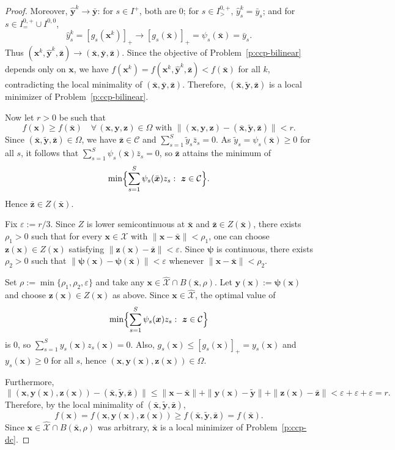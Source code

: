 \documentclass[10pt,a4paper]{amsart}
\def\C{\mathcal{C}}
\def\X{\mathcal{X}}
\def\bs{\boldsymbol}
\begin{document}
\begin{proof}
Moreover, $\hat{\bs{y}}^k\to\bar{\bs{y}}$: for $s\in I^+$, both are $0$; for $s\in I^{0,+}_{>}$,
$\hat y_s^k=\bar y_s$; and for $s\in I^{0,+}_{=}\cup I^{0,0}$,
\[
\hat y_s^k=[g_s(\bs{x}^k)]_+\to[g_s(\bar{\bs{x}})]_+=\psi_s(\bar{\bs{x}})=\bar y_s.
\]
Thus $(\bs{x}^k,\hat{\bs{y}}^k,\bar{\bs{z}})\to(\bar{\bs{x}},\bar{\bs{y}},\bar{\bs{z}})$.
Since the objective of Problem~\eqref{p:ccp-bilinear} depends only on $\bs{x}$, we have
$f(\bs{x}^k)=f(\bs{x}^k,\hat{\bs{y}}^k,\bar{\bs{z}})<f(\bar{\bs{x}})$ for all $k$, contradicting the local
minimality of $(\bar{\bs{x}},\bar{\bs{y}},\bar{\bs{z}})$. Therefore,
$(\bar{\bs{x}},\tilde{\bs{y}},\bar{\bs{z}})$ is a local minimizer of Problem~\eqref{p:ccp-bilinear}.

Now let $r>0$ be such that
\[
f(\bs{x})\ge f(\bar{\bs{x}})
\quad \forall\,(\bs{x},\bs{y},\bs{z})\in\Omega
\text{ with }
\|(\bs{x},\bs{y},\bs{z})-(\bar{\bs{x}},\tilde{\bs{y}},\bar{\bs{z}})\|<r.
\]
Since $(\bar{\bs{x}},\tilde{\bs{y}},\bar{\bs{z}})\in\Omega$, we have
$\bar{\bs{z}}\in\C$ and $\sum_{s=1}^S\tilde{y}_s\bar{z}_s=0$. As
$\tilde{y}_s=\psi_s(\bar{\bs{x}})\ge 0$ for all $s$, it follows that
$\sum_{s=1}^S\psi_s(\bar{\bs{x}})\bar{z}_s=0$, so $\bar{\bs{z}}$ attains the minimum of
\[
\min\Bigl\{\sum_{s=1}^S\psi_s(\bar{\bs{x}})z_s:\ \bs{z}\in\C\Bigr\}.
\]
Hence $\bar{\bs{z}}\in Z(\bar{\bs{x}})$.

Fix $\varepsilon:=r/3$. Since $Z$ is lower semicontinuous at $\bar{\bs{x}}$ and
$\bar{\bs{z}}\in Z(\bar{\bs{x}})$, there exists $\rho_1>0$ such that for every
$\bs{x}\in\X$ with $\|\bs{x}-\bar{\bs{x}}\|<\rho_1$, one can choose
$\bs{z}(\bs{x})\in Z(\bs{x})$ satisfying $\|\bs{z}(\bs{x})-\bar{\bs{z}}\|<\varepsilon$.
Since $\bs{\psi}$ is continuous, there exists $\rho_2>0$ such that
$\|\bs{\psi}(\bs{x})-\bs{\psi}(\bar{\bs{x}})\|<\varepsilon$ whenever
$\|\bs{x}-\bar{\bs{x}}\|<\rho_2$.

Set $\rho:=\min\{\rho_1,\rho_2,\varepsilon\}$ and take any
$\bs{x}\in\hat{\X}\cap B(\bar{\bs{x}},\rho)$. Let $\bs{y}(\bs{x}):=\bs{\psi}(\bs{x})$ and choose
$\bs{z}(\bs{x})\in Z(\bs{x})$ as above. Since $\bs{x}\in\hat{\X}$, the optimal value of
\[
\min\Bigl\{\sum_{s=1}^S\psi_s(\bs{x})z_s:\ \bs{z}\in\C\Bigr\}
\]
is $0$, so $\sum_{s=1}^S y_s(\bs{x})z_s(\bs{x})=0$. Also,
$g_s(\bs{x})\le[g_s(\bs{x})]_+=y_s(\bs{x})$ and $y_s(\bs{x})\ge 0$ for all $s$, hence
$(\bs{x},\bs{y}(\bs{x}),\bs{z}(\bs{x}))\in\Omega$.

Furthermore,
\[
\|(\bs{x},\bs{y}(\bs{x}),\bs{z}(\bs{x}))-(\bar{\bs{x}},\tilde{\bs{y}},\bar{\bs{z}})\|
\le \|\bs{x}-\bar{\bs{x}}\|+\|\bs{y}(\bs{x})-\tilde{\bs{y}}\|+\|\bs{z}(\bs{x})-\bar{\bs{z}}\|
<\varepsilon+\varepsilon+\varepsilon=r.
\]
Therefore, by the local minimality of $(\bar{\bs{x}},\tilde{\bs{y}},\bar{\bs{z}})$,
\[
f(\bs{x})=f(\bs{x},\bs{y}(\bs{x}),\bs{z}(\bs{x}))
\ge f(\bar{\bs{x}},\tilde{\bs{y}},\bar{\bs{z}})
= f(\bar{\bs{x}}).
\]
Since $\bs{x}\in\hat{\X}\cap B(\bar{\bs{x}},\rho)$ was arbitrary, $\bar{\bs{x}}$ is a local minimizer of
Problem~\eqref{p:ccp-dc}.
\end{proof}
\end{document}
